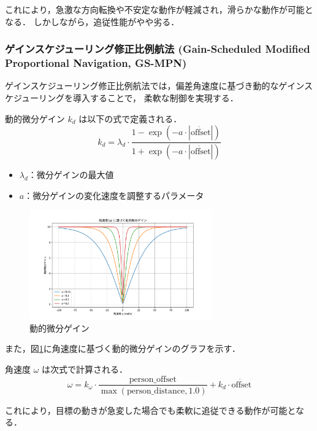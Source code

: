これにより，急激な方向転換や不安定な動作が軽減され，滑らかな動作が可能となる．
しかしながら，追従性能がやや劣る．

\subsubsection{ゲインスケジューリング修正比例航法
    (Gain-Scheduled Modified Proportional Navigation, GS-MPN)}
ゲインスケジューリング修正比例航法では，偏差角速度に基づき動的なゲインスケジューリングを導入することで，
柔軟な制御を実現する．

動的微分ゲイン \(k_d\) は以下の式で定義される．
\begin{equation}
    k_d = \lambda_d \cdot \frac{1 - \exp(-a \cdot |\dot{\text{offset}}|)}{1 + \exp(-a \cdot |\dot{\text{offset}}|)}
\end{equation}
\begin{itemize}
    \item \(\lambda_d\)：微分ゲインの最大値
    \item \(a\)：微分ゲインの変化速度を調整するパラメータ
\end{itemize}

\begin{figure}[H]
    \centering
    \includegraphics[width=0.7\textwidth]{figure/dynamicgain.pdf}
    \caption{動的微分ゲイン}
    \label{fig:dynamicgain}
\end{figure}
また，図\ref{fig:dynamicgain}に角速度に基づく動的微分ゲインのグラフを示す．

角速度 \(\omega\) は次式で計算される．
\begin{equation}
    \omega = k_\omega \cdot \frac{\text{person\_offset}}{\max(\text{person\_distance}, 1.0)} + k_d \cdot \dot{\text{offset}}
\end{equation}

これにより，目標の動きが急変した場合でも柔軟に追従できる動作が可能となる．
